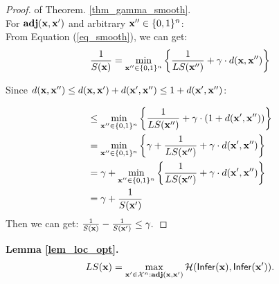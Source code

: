 \documentclass{article}
\begin{document}
\begin{proof}
of Theorem. \ref{thm_gamma_smooth}.\\
For $\textbf{adj}(\textbf{x},\textbf{x}')$ and arbitrary $\textbf{x}'' \in \{0,1\}^{n}$:\\
From Equation (\ref{eq_smooth}), we can get:
\[
\frac{1}{S(\textbf{x})} 
 = \min_{\textbf{x}'' \in \{0,1\}^{n}}\bigg \{ \frac{1}{LS(\textbf{x}'')} +\gamma \cdot d(\textbf{x},\textbf{x}'') \bigg \}\\
\]

Since $d(\textbf{x},\textbf{x}'') \leq d(\textbf{x},\textbf{x}') + d(\textbf{x}',\textbf{x}'') \leq 1 + d(\textbf{x}',\textbf{x}'')$:

\begin{equation*}
\begin{split}
& \leq \min_{\textbf{x}'' \in \{0,1\}^{n}}\bigg \{  \frac{1}{LS(\textbf{x}'')} +\gamma \cdot (1 + d(\textbf{x}',\textbf{x}'')) \bigg \}\\
& = \min_{\textbf{x}'' \in \{0,1\}^{n}}\bigg \{
\gamma + \frac{1}{LS(\textbf{x}'')} +\gamma \cdot d(\textbf{x}',\textbf{x}'')\bigg 
\}\\
& = \gamma + \min_{\textbf{x}'' \in \{0,1\}^{n}}\bigg \{
\frac{1}{LS(\textbf{x}'')} +\gamma \cdot d(\textbf{x}',\textbf{x}'')\bigg
\}\\
& = \gamma + \frac{1}{S(\textbf{x}')}
\end{split}
\end{equation*}
Then we can get:
$\frac{1}{S(\textbf{x})} - \frac{1}{S(\textbf{x}')} \leq \gamma.$
\end{proof}


\noindent \textbf{Lemma \ref{lem_loc_opt}.}
\emph{
\[
LS(\textbf{x}) = \max\limits_{\textbf{x}' \in \mathcal{X}^n:\textbf{adj}(\textbf{x},\textbf{x}')} \mathcal{H}(\mathsf{Infer}(\textbf{x}), \mathsf{Infer}(\textbf{x}')).
\]
}
\end{document}

